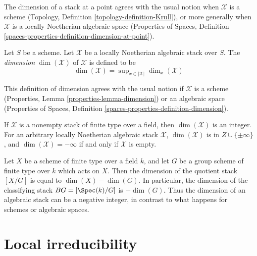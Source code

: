 \noindent
The dimension of a stack at a point agrees with the usual notion
when $\mathcal{X}$ is a scheme (Topology, Definition
\ref{topology-definition-Krull}),
or more generally when $\mathcal{X}$ is a locally Noetherian algebraic space
(Properties of Spaces, Definition
\ref{spaces-properties-definition-dimension-at-point}).

\begin{definition}
\label{definition-dimension}
Let $S$ be a scheme. Let $\mathcal{X}$ be
a locally Noetherian algebraic stack over $S$.
The {\it dimension} $\dim(\mathcal{X})$ of $\mathcal{X}$ is defined to be
$$
\dim(\mathcal{X}) = \sup\nolimits_{x \in |\mathcal{X}|} \dim_x(\mathcal{X})
$$
\end{definition}

\noindent
This definition of dimension agrees with the usual notion
if $\mathcal{X}$ is a scheme
(Properties, Lemma \ref{properties-lemma-dimension})
or an algebraic space (Properties of Spaces, Definition
\ref{spaces-properties-definition-dimension}).

\begin{remark}
\label{remark-dimension-empty-stack}
If $\mathcal{X}$ is a nonempty stack of finite type over a field,
then $\dim(\mathcal{X})$ is an integer. For an arbitrary
locally Noetherian algebraic stack $\mathcal{X}$,
$\dim(\mathcal{X})$ is in $Z\cup \{\pm \infty\}$,
and $\dim(\mathcal{X}) = -\infty$ if and only if $\mathcal{X}$
is empty.
\end{remark}

\begin{example}
\label{example-dimension-quotient-stack}
Let $X$ be a scheme of finite type over a field $k$, and let $G$
be a group scheme of finite type over $k$ which acts on $X$.
Then the dimension of the quotient stack $[X/G]$ is equal to
$\dim(X)-\dim(G)$. In particular, the dimension of the classifying
stack $BG=[\Spec(k)/G]$ is $-\dim(G)$. Thus the dimension of an algebraic
stack can be a negative integer, in contrast to what happens for schemes
or algebraic spaces.
\end{example}






\section{Local irreducibility}
\label{section-irreducible-local-ring}

